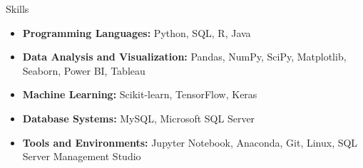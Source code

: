 \documentclass[]{mcdowellcv}
\begin{document}
        \begin{cvsection}{Skills}
            \begin{cvsubsection}{}{}{}
                \begin{itemize}
                    \item \textbf{Programming Languages:} Python, SQL, R, Java
                    \item \textbf{Data Analysis and Visualization:} Pandas, NumPy, SciPy, Matplotlib, Seaborn, Power BI, Tableau
                    \item \textbf{Machine Learning:} Scikit-learn, TensorFlow, Keras
                    \item \textbf{Database Systems:} MySQL, Microsoft SQL Server
                    \item \textbf{Tools and Environments:} Jupyter Notebook, Anaconda, Git, Linux, SQL Server Management Studio
                \end{itemize}
            \end{cvsubsection}
        \end{cvsection}
\end{document}
